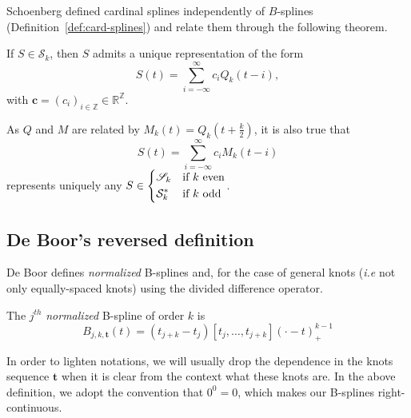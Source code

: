 Schoenberg defined cardinal splines independently of  $B$-splines (Definition~\ref{def:card-splines}) and relate them 
through the following theorem.
\begin{thm}
    If $S \in \mathscr{S}_k$, then $S$ admits a unique representation of the form
    \begin{equation*}
      S(t) = \sum_{i=-\infty}^{\infty} c_i Q_k(t-i),
    \end{equation*}
    with $\bm{c} = {(c_i)}_{i \in \mathbb{Z}} \in \mathbb{R}^\mathbb{Z}$.
\end{thm} 
As $Q$ and $M$ are related by $M_k(t) = Q_k(t+\frac{k}{2})$, it is also true that
\begin{equation*}
      S(t) = \sum_{i=-\infty}^{\infty} c_i M_k(t-i)
\end{equation*}
represents uniquely any $S \in \begin{dcases}\mathscr{S}_k & \text{if $k$ even} \\ \mathcal{S}_k^* & \text{if $k$ odd} 
\end{dcases}$.

\subsection{De Boor's reversed definition}

De Boor defines \emph{normalized} B-splines and, for the case of general knots (\textit{i.e} not only equally-spaced 
knots) using the divided difference operator.  
\begin{deftn}
  The $j^{th}$ \emph{normalized} B-spline of order $k$ is
  \begin{equation}
    B_{j, k, \bm{t}}(t) = (t_{j+k}-t_j)[t_j, \ldots, t_{j+k}]{(\cdot-t)}_+^{k-1}
  \end{equation}
\end{deftn}
In order to lighten notations, we will usually drop the dependence in the knots sequence $\bm{t}$ when it is clear from 
the context what these knots are. In the above definition, we adopt the convention that $0^0 = 0$, which makes our 
B-splines right-continuous.

